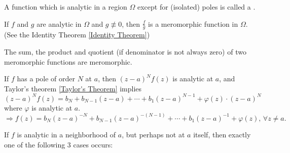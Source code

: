 \begin{definition}
    A function which is analytic in a region $ \Omega $ except for (isolated) poles is called a .
\end{definition}
\begin{example}
    If  $ f $ and  $ g $ are analytic in  $ \Omega $ and  $ g\not\equiv 0 $, then  $ \frac{f}{g} $ is a meromorphic function in  $ \Omega $. (See the Identity Theorem \ref{Identity Theorem})
\end{example}
\begin{remark}
    The sum, the product and quotient (if denominator is not always zero) of two meromorphic functions are meromorphic.
\end{remark}
If  $ f $ has a pole of order  $ N $ at  $ a $, then  $ (z-a)^Nf(z) $ is analytic at  $ a $, and Taylor's theorem \ref{Taylor's Theorem} implies 
\begin{equation}
    (z-a)^Nf(z)=b_N+b_{N-1}(z-a)+\cdots+b_1(z-a)^{N-1}+\varphi(z)\cdot(z-a)^N
\end{equation}
where  $ \varphi $ is analytic at  $ a $.
\begin{equation}
    \Rightarrow  f(z)=b_N(z-a)^{-N}+b_{N-1}(z-a)^{-(N-1)}+\cdots+b_1(z-a)^{-1}+\varphi(z),\,\forall z\neq a . 
\end{equation} 
\begin{theorem}
    If  $ f $ is analytic in a neighborhood of  $ a $, but perhaps not at  $ a $ itself, then exactly one of the following  $ 3 $ cases occurs:
\end{theorem} 